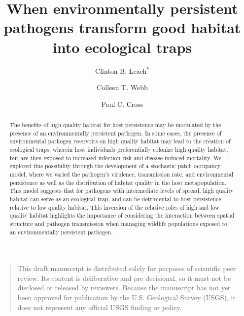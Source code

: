 \documentclass{article}
\begin{document}
\title{When environmentally persistent pathogens transform good habitat into ecological traps}

\author[1]{Clinton B. Leach$^*$}
\author[1]{Colleen T. Webb}
\author[2]{Paul C. Cross}


\maketitle


\begin{quote}
This draft manuscript is distributed solely for purposes of scientific peer review.  Its content is deliberative and pre decisional, so it must not be disclosed or released by reviewers.  Because the manuscript has not yet been approved for publication by the U.S. Geological Survey (USGS), it does not represent any official USGS finding or policy.
\end{quote}

\newpage

\begin{abstract} 
The benefits of high quality habitat for host persistence may be modulated by the presence of an environmentally persistent pathogen. In some cases, the presence of environmental pathogen reservoirs on high quality habitat may lead to the creation of ecological traps, wherein host individuals preferentially colonize high quality habitat, but are then exposed to increased infection risk and disease-induced mortality.  We explored this possibility through the development of a stochastic patch occupancy model, where we varied the pathogen's virulence, transmission rate, and environmental persistence as well as the distribution of habitat quality in the host metapopulation.  This model suggests that for pathogens with intermediate levels of spread, high quality habitat can serve as an ecological trap, and can be detrimental to host persistence relative to low quality habitat.  This inversion of the relative roles of high and low quality habitat highlights the importance of considering the interaction between spatial structure and pathogen transmission when managing wildlife populations exposed to an environmentally persistent pathogen.
\end{abstract}
\end{document}
